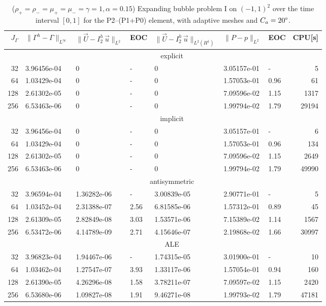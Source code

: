 \documentclass[a4paper,12pt,onecolumn]{article}
\newcommand{\errorXx}{\|\Gamma^h - \Gamma\|_{L^\infty}}
\newcommand{\LerrorUu}[1]{\|\vec U - I^h_{#1}\,\vec u\|_{L^2}}
\newcommand{\HerrorUu}[1]{\|\vec U - I^h_{#1}\,\vec u\|_{L^2(H^1)}}
\newcommand{\LerrorPp}{\|P - p\|_{L^2}}
\begin{document}
\begin{table}
\center
\hspace*{-3.25cm}
\begin{tabular}{rllllllr}
\hline
$J_\Gamma$ & $\errorXx$ & $\LerrorUu2$ & EOC & $\HerrorUu2$ & $\LerrorPp$ & EOC
& CPU[s] \\
\hline
& \multicolumn{7}{c}{explicit} \\
\hline
 32 & 3.96456e-04 & 0 & - & 0 & 3.05157e-01 &    - &     5 \\
 64 & 1.03429e-04 & 0 & - & 0 & 1.57053e-01 & 0.96 &    61 \\
128 & 2.61302e-05 & 0 & - & 0 & 7.09596e-02 & 1.15 &  1317 \\
256 & 6.53463e-06 & 0 & - & 0 & 1.99794e-02 & 1.79 & 29194 \\
\hline
& \multicolumn{7}{c}{implicit} \\
\hline
 32 & 3.96456e-04 & 0 & - & 0 & 3.05157e-01 &    - &     6 \\
 64 & 1.03429e-04 & 0 & - & 0 & 1.57053e-01 & 0.96 &   134 \\
128 & 2.61302e-05 & 0 & - & 0 & 7.09596e-02 & 1.15 &  2649 \\
256 & 6.53463e-06 & 0 & - & 0 & 1.99794e-02 & 1.79 & 49990 \\
\hline
& \multicolumn{7}{c}{antisymmetric} \\
\hline
 32 & 3.96594e-04 & 1.36282e-06 &    - & 3.00839e-05 & 2.90771e-01 &    - &
5 \\
 64 & 1.03452e-04 & 2.31388e-07 & 2.56 & 6.81585e-06 & 1.57312e-01 & 0.89 &
45 \\
128 & 2.61309e-05 & 2.82849e-08 & 3.03 & 1.53571e-06 & 7.15389e-02 & 1.14 &
1567 \\
256 & 6.53472e-06 & 4.14789e-09 & 2.71 & 4.15646e-07 & 2.19868e-02 & 1.66 &
30997 \\
\hline
& \multicolumn{7}{c}{ALE} \\
\hline
 32 & 3.96823e-04 & 1.94467e-06 &    - & 1.74315e-05 & 3.01900e-01 &    - &
10 \\
 64 & 1.03462e-04 & 1.27547e-07 & 3.93 & 1.33117e-06 & 1.57054e-01 & 0.94 &
160 \\
128 & 2.61390e-05 & 4.26296e-08 & 1.58 & 3.78211e-07 & 7.09597e-02 & 1.15 &
2420 \\
256 & 6.53680e-06 & 1.09827e-08 & 1.91 & 9.46271e-08 & 1.99793e-02 & 1.79 &
47181 \\
\hline
\end{tabular}
\hspace*{-3.25cm}
\caption[Navier--Stokes expanding bubble I errors P2--(P1+P0)]
{($\rho_+ = \rho_- = \mu_+ = \mu_- = \gamma = 1,\alpha=0.15$)
Expanding bubble problem I on $(-1,1)^2$ over the time interval $[0,1]$ for the
P2--(P1+P0) element, with adaptive meshes and $C_a=20\degree$.}
\label{tab:nsexpandingbubbleIp2p1p0}
\end{table}
\end{document}
